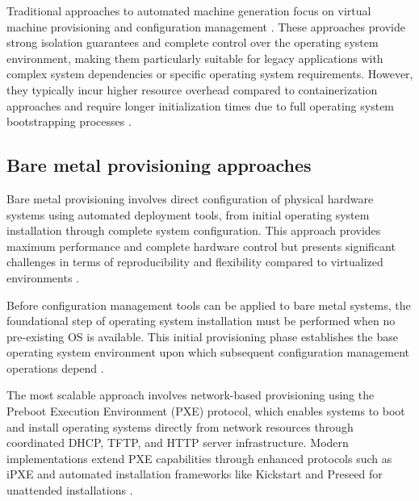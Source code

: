 
Traditional approaches to automated machine generation focus on virtual machine provisioning and configuration management \citep{portnoyVirtualizationEssentials2016}.
These approaches provide strong isolation guarantees and complete control over the operating system environment, making them particularly suitable for legacy applications with complex system dependencies or specific operating system requirements.
However, they typically incur higher resource overhead compared to containerization approaches and require longer initialization times due to full operating system bootstrapping processes \citep{felterUpdatedPerformanceComparison2015}.

\newpage
\subsection{Bare metal provisioning approaches}
Bare metal provisioning involves direct configuration of physical hardware systems using automated deployment tools, from initial operating system installation through complete system configuration.
This approach provides maximum performance and complete hardware control but presents significant challenges in terms of reproducibility and flexibility compared to virtualized environments \citep{nemethUNIXLinuxSystem2017}.

Before configuration management tools can be applied to bare metal systems, the foundational step of operating system installation must be performed when no pre-existing OS is available.
This initial provisioning phase establishes the base operating system environment upon which subsequent configuration management operations depend \citep{nemethUNIXLinuxSystem2017}.

The most scalable approach involves network-based provisioning using the Preboot Execution Environment (PXE) protocol, which enables systems to boot and install operating systems directly from network resources through coordinated DHCP, TFTP, and HTTP server infrastructure.
Modern implementations extend PXE capabilities through enhanced protocols such as iPXE and automated installation frameworks like Kickstart and Preseed for unattended installations \citep{silberschatzOperatingSystemConcepts2018}.

